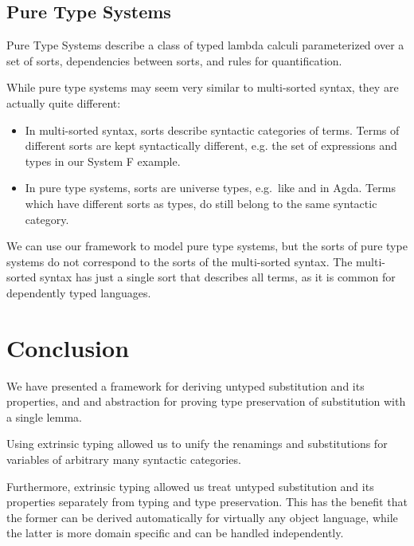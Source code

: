 \documentclass[a4paper, UKenglish, cleveref, autoref, thm-restate]{lipics-v2021}
\newcommand*\ACode[1]{\AgdaFontStyle{\textcolor{mygray}{#1}}}
\begin{document}

  \subsection{Pure Type Systems}
  Pure Type Systems\cite{DBLP:conf/esop/BarendregtH90, berarditowards, terlouw1989een}
  describe a class of typed lambda calculi parameterized over a set of
  sorts, dependencies between sorts, and rules for quantification.

  While pure type systems may seem very similar to multi-sorted
  syntax, they are actually quite different:
  \begin{itemize}
  \item 
    In multi-sorted syntax, sorts describe syntactic categories of terms. Terms
    of different sorts are kept syntactically different, e.g. the set of expressions
    \ACode{S ⊢ 𝕖} and types \ACode{S ⊢ 𝕥} in our System F example.
  \item 
    In pure type systems, sorts are universe types, e.g.\ like
    \ACode{Set} and \ACode{Set₁} in Agda.
    Terms which have different sorts as types, do still belong to the
    same syntactic category.
  \end{itemize}

  We can use our framework to model pure type systems, but the sorts of pure type systems
  do not correspond to the sorts of the multi-sorted syntax. The multi-sorted syntax
  has just a single sort that describes all terms, as it is common for
  dependently typed languages.

  \section{Conclusion}
  \label{sec:conclusion}
  We have presented a framework for deriving untyped substitution and its properties, and
  and abstraction for proving type preservation of substitution with a single lemma.

  Using extrinsic typing allowed us to unify the renamings and
  substitutions for variables of arbitrary many syntactic categories.

  Furthermore, extrinsic typing allowed us treat untyped substitution
  and its properties separately from typing and type preservation.
  This has the benefit that the former can be derived automatically for virtually
  any object language, while the latter is more domain specific and
  can be handled independently.
\end{document}
